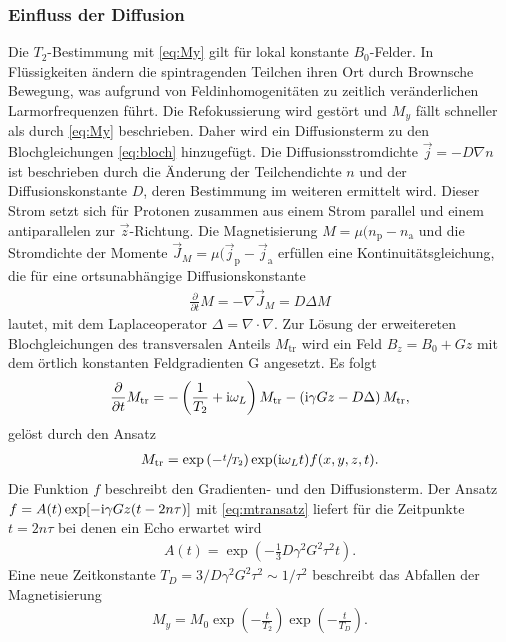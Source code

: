 \subsubsection{Einfluss der Diffusion}
Die $T_2$-Bestimmung mit \eqref{eq:My} gilt für lokal konstante $B_0$-Felder. In Flüssigkeiten ändern die spintragenden Teilchen ihren Ort
durch Brownsche Bewegung, was aufgrund von Feldinhomogenitäten zu zeitlich veränderlichen Larmorfrequenzen führt. Die Refokussierung wird
gestört und $M_y$ fällt schneller als durch \eqref{eq:My} beschrieben. Daher wird ein Diffusionsterm zu den Blochgleichungen \eqref{eq:bloch}
hinzugefügt. Die Diffusionsstromdichte $\vec j=-D\nabla n$ ist beschrieben durch die Änderung der Teilchendichte $n$ und der Diffusionskonstante $D$,
deren Bestimmung im weiteren ermittelt wird. Dieser Strom setzt sich für Protonen zusammen aus einem Strom parallel und einem antiparallelen zur
$\vec z$-Richtung. Die Magnetisierung $M=\mu(n_\text{p}-n_\text{a}$ und die Stromdichte der Momente 
$\vec J_M = \mu (\vec j_\text{p} - \vec j_\text{a}$ erfüllen eine Kontinuitätsgleichung, die für eine ortsunabhängige Diffusionskonstante 
\begin{align}
 \frac{\partial}{\partial t}M = -\nabla \vec J_M = D\Delta M
\end{align}
lautet, mit dem Laplaceoperator $\Delta = \nabla\cdot \nabla$. Zur Lösung der erweitereten Blochgleichungen des transversalen Anteils $M_\text{tr}$
wird ein Feld $B_z = B_0 + Gz$ mit dem örtlich konstanten Feldgradienten G angesetzt. Es folgt
\begin{align}
 \frac{\partial}{\partial t}M_\text{tr} = -\left(\frac{1}{T_2}+\text{i}\omega_L\right)M_\text{tr} - \left(\text{i}\gamma Gz - D\Delta\right)M_\text{tr},
 \label{eq:mtrDGL}
\end{align}
gelöst durch den Ansatz
\begin{align}
 M_\text{tr} = \exp\left(-\sfrac{t}{T_2}\right)\exp(\text{i}\omega_L t) f(x,y,z,t).
 \label{eq:mtransatz}
\end{align}
Die Funktion $f$ beschreibt den Gradienten- und den Diffusionsterm. Der Ansatz $f= A(t) \exp[-\text{i}\gamma Gz(t-2n\tau)]$ mit \eqref{eq:mtransatz}
liefert für die Zeitpunkte $t=2n\tau$ bei denen ein Echo erwartet wird
\begin{align}
 A(t) = \exp\left(-\frac13 D\gamma^2 G^2 \tau^2 t\right).
\end{align}
Eine neue Zeitkonstante $T_D = 3/D\gamma^2G^2 \tau^2\sim1/\tau^2$ beschreibt das Abfallen der Magnetisierung
\begin{align}
 M_y = M_0\exp\left(-\frac{t}{T_2}\right)\exp\left(-\frac{t}{T_D}\right).
 \label{eq:MyDiff}
\end{align}
